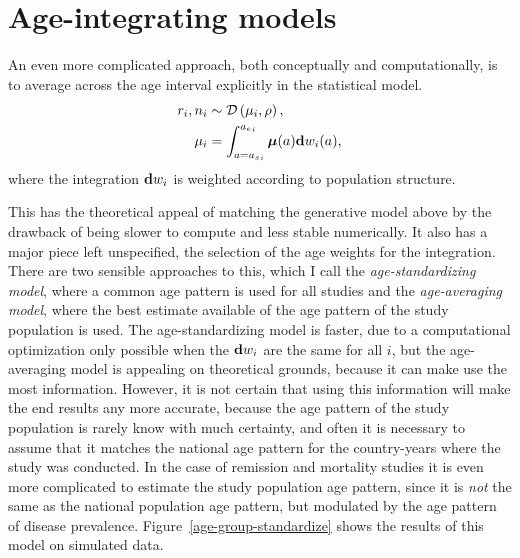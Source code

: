 \section{Age-integrating models}
An even more complicated approach, both conceptually and
computationally, is to average across the age interval explicitly in
the statistical model.
\begin{align*}
r_i, n_i &\sim \mathcal{D}\left(\mu_i, \rho\right),\\
\mu_i &= \int_{a={a_s}_i}^{{a_e}_i} \boldsymbol{\mu}(a)\mathbf{d} w_i(a),
\end{align*}
where the integration $\mathbf{d} w_i$ is weighted according to population
structure.

This has the theoretical appeal of matching the generative model above
by the drawback of being slower to compute and less stable
numerically.  It also has a major piece left unspecified, the
selection of the age weights for the integration.  There are two
sensible approaches to this, which I call the \emph{age-standardizing
  model}, where a common age pattern is used for all studies and the
\emph{age-averaging model}, where the best estimate available of the
age pattern of the study population is used.  The age-standardizing
model is faster, due to a computational optimization only possible
when the $\mathbf{d} w_i$ are the same for all $i$, but the age-averaging
model is appealing on theoretical grounds, because it can make use the most
information.  However, it is not certain that using this
information will make the end results any more accurate, because the
age pattern of the study population is rarely know with much
certainty, and often it is necessary to assume that it matches the
national age pattern for the country-years where the study was
conducted.  In the case of remission and mortality studies it is even
more complicated to estimate the study population age pattern, since
it is \emph{not} the same as the national population age pattern, but
modulated by the age pattern of disease prevalence.
Figure~\ref{age-group-standardize} shows the results of this model on
simulated data.

